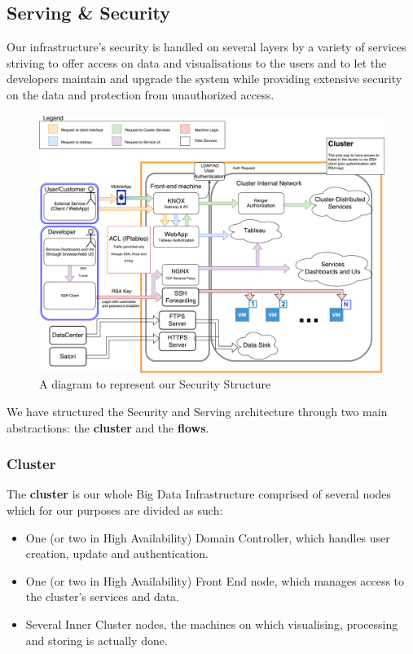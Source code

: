 \subsection{Serving \& Security}
Our infrastructure's security is handled on several layers by a variety of services striving to offer access on data and visualisations to the users and to let the developers maintain and upgrade the system while providing extensive security on the data and protection from unauthorized access.

\begin{figure}[h]
	\centering
	\includegraphics[scale=0.4]{Figures/SecurityStructureDiagram}
	\decoRule
	\caption[Security Structure Diagram]{A diagram to represent our Security Structure}
	\label{fig:SecurityStructureDiagram}
\end{figure}

We have structured the Security and Serving architecture through two main abstractions: the \textbf{cluster} and the \textbf{flows}.
\subsubsection{Cluster}
The \textbf{cluster} is our whole Big Data Infrastructure comprised of several nodes which for our purposes are divided as such:
\begin{itemize}
	\item One (or two in High Availability) Domain Controller, which handles user creation, update and authentication.
	\item One (or two in High Availability) Front End node, which manages access to the cluster's services and data.
	\item Several Inner Cluster nodes, the machines on which visualising, processing and storing is actually done.
\end{itemize}

